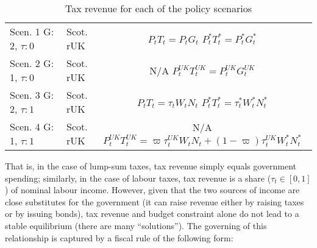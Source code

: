 \begin{table}[H]
    \renewcommand{\arraystretch}{2}
    \centering
    \begin{tabular}{l|l|c}
    \makecell{Scen. 1 \\ G: 2, $\tau: 0$} & \makecell{Scot. \\ rUK } & 
        \makecell{
            $P_t T_t = P_tG_t$\\
            $ P^*_tT^*_t = P^*_tG^*_t $
        }  \\ 
    \makecell{Scen. 2 \\ G: 1, $\tau: 0$} & \makecell{Scot. \\ rUK } & 
        \makecell{
            N/A\\
            $P^{UK}_tT^{UK}_t = P^{UK}_tG^{UK}_t$
        }   \\ 
    \makecell{Scen. 3 \\ G: 2, $\tau: 1$} & \makecell{Scot. \\ rUK } & 
    \makecell{
        $P_tT_t = \tau_tW_t N_t$\\ 
        $P^*_tT^*_t = \tau^*_tW^*_t N^*_t$
    }  \\
    \makecell{Scen. 4 \\ G: 1, $\tau: 1$} & \makecell{Scot. \\ rUK } & 
    \makecell{
        N/A \\
        $P^{UK}_tT^{UK}_t = \varpi\tau^{UK}_tW_t N_t + (1-\varpi)\tau^{UK}_tW^*_t N^*_t$
    }  
    \end{tabular}
    \caption{Tax revenue for each of the policy scenarios}
\end{table}
That is, in the case of lump-sum taxes, tax revenue simply equals government spending; similarly, in the case of labour taxes, tax revenue is a share ($ \tau_t \in [0,1]$) of nominal labour income. However, given that the two sources of income are close substitutes for the government (it can raise revenue either by raising taxes or by issuing bonds), tax revenue and budget constraint alone do not lead to a stable equilibrium (there are many ``solutions''). The governing of this relationship is captured by a fiscal rule of the following form:
